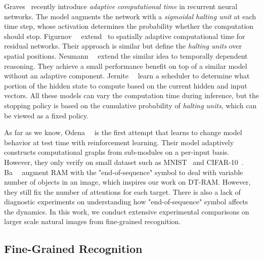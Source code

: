 \documentclass[10pt,twocolumn,letterpaper]{article}
\begin{document}
Graves~\cite{graves2016adaptive} recently introduce {\em adaptive computational time} in recurrent neural networks.
The model augments the network with a {\em sigmoidal halting unit} at each time step, whose activation determines the probability whether the computation should stop.
Figurnov~\etal~\cite{figurnov2016spatially} extend~\cite{graves2016adaptive} to spatially adaptive computational time for residual networks.
Their approach is similar but define the {\em halting units} over spatial positions.
Neumann~\etal~\cite{neumann2016learning} extend the similar idea to temporally dependent reasoning.
They achieve a small performance benefit on top of a similar model without an adaptive component.
Jernite~\etal~\cite{jernite2016variable} learn a scheduler to determine what portion of the hidden state to compute based on the current hidden and input vectors.
All these models can vary the computation time during inference, but the stopping policy is based on the cumulative probability of {\em halting units}, which can be viewed as a fixed policy.

As far as we know, Odena~\etal~\cite{odena2017changing} is the first attempt that learns to change model behavior at test time with reinforcement learning.
Their model adaptively constructs computational graphs from sub-modules on a per-input basis.
However, they only verify on small dataset such as MNIST~\cite{lecun1998gradient} and CIFAR-10~\cite{krizhevsky2009learning}.
Ba~\etal~\cite{ba2014multiple} augment RAM with the "end-of-sequence" symbol to deal with variable number of objects in an image, which inspires our work on DT-RAM.
However, they still fix the number of attentions for each target.
There is also a lack of diagnostic experiments on understanding how "end-of-sequence" symbol affects the dynamics.
In this work, we conduct extensive experimental comparisons on larger scale natural images from fine-grained recognition.

\subsection{Fine-Grained Recognition}
\end{document}
